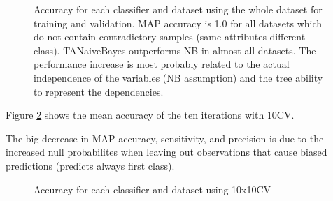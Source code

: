 \documentclass[a4paper,10pt]{article}
\begin{document}
\begin{figure}[H]
\caption{Accuracy for each classifier and dataset using the whole dataset for training and validation. MAP accuracy is 1.0 for all datasets which do not contain contradictory samples (same attributes different class). TANaiveBayes outperforms NB in almost all datasets. The performance increase is most probably related to the actual independence of the variables (NB assumption) and the tree ability to represent the dependencies.}
\label{fig:degenerate}
\end{figure}

Figure \ref{fig:accuracy} shows the mean accuracy of the ten iterations with 10CV.

The big decrease in MAP accuracy, sensitivity, and precision is due to the increased null probabilites when leaving out observations that cause biased predictions (predicts always first class).

\begin{figure}[H]
\caption{Accuracy for each classifier and dataset using 10x10CV}
\label{fig:accuracy}
\end{figure}
\end{document}

